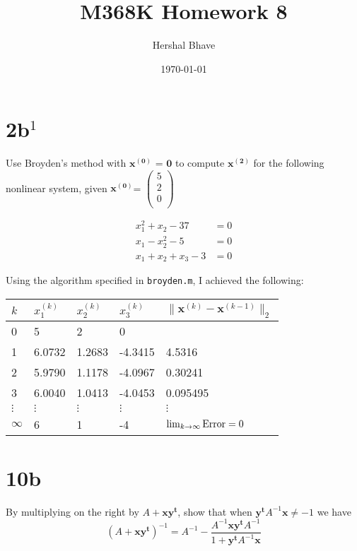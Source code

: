 \documentclass[a4paper,12pt]{article}
\title{M368K Homework 8}
\author{Hershal Bhave}
\date{\today}
\begin{document}
\maketitle 

\section{2b$^{1}$}
Use Broyden's method with $\mathbf{x^{(0)}}$ = $\mathbf{0}$ to compute
$\mathbf{x^{(2)}}$ for the following nonlinear system, given
$\mathbf{x^{(0)}}$=
$\begin{pmatrix}
  5\\
  2\\
  0\\
\end{pmatrix}$

\begin{align}
  \label{eq:2b}
  x^2_1+x_2-37&=0\\
  x_1-x^2_2-5&=0\\
  x_1+x_2+x_3-3&=0
\end{align}

Using the algorithm specified in \texttt{broyden.m}, I achieved the
following:\\

\setlength{\tabcolsep}{2em}
\begin{center}
  \begin{tabular}[c]{lllll}
    \hline
    $k$ & $x^{(k)}_1$  & $x^{(k)}_2$ & $x^{(k)}_3$ & $\|\mathbf{x}^{(k)}-\mathbf{x}^{(k-1)}\|_2$ \\
    \hline
    0 & 5 & 2 & 0 &  \\
    1 & 6.0732 & 1.2683 & -4.3415 & 4.5316 \\
    2 & 5.9790 & 1.1178 & -4.0967 & 0.30241 \\
    3 & 6.0040 & 1.0413 & -4.0453 & 0.095495 \\
    $\vdots$ &$\vdots$ & $\vdots$ & $\vdots$ & $\vdots$ \\
    $\infty$ & 6 & 1 & -4 & $\lim_{k \to \infty}\textnormal{Error}=0$ \\
    \hline
  \end{tabular}
\end{center}

\begin{minipage}{1.0\linewidth}
  
\end{minipage}

\newpage
\section{10b}
By multiplying on the right by $A + \mathbf{x y^{t}}$, show that when
$\mathbf{y^{t}} A^{-1} \mathbf{x} \ne -1$ we have
\begin{equation}
  \label{eq:10b}
  (A+\mathbf{x y^{t}})^{-1} = A^{-1} - \frac{A^{-1} \mathbf{x y^{t}} A^{-1}}{1+\mathbf{y^{t}}A^{-1}\mathbf{x}}
\end{equation}
\end{document}
